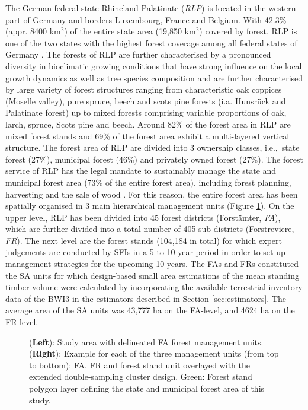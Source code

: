 \documentclass[remotesensing,article,accept,moreauthors,pdftex,10pt,a4paper]{Definitions/mdpi}
\begin{document}
The German federal state Rhineland-Palatinate (\textit{RLP}) is located in the western part of Germany and borders Luxembourg, France and Belgium. With 42.3\% (appr. 8400 km$^2$) of the entire state area (19,850 km$^2$) covered by forest, RLP is one of the two states with the highest forest coverage among all federal states of Germany \citep{bwi3}. The forests of RLP are further characterised by a pronounced diversity in bioclimatic growing conditions that have strong influence on the local growth dynamics as well as tree species composition \citep{gauer2005} and are further characterised by large variety of forest structures ranging from characteristic oak coppices (Moselle valley), pure spruce, beech and scots pine forests (i.a. Hunsr{\"u}ck and Palatinate forest) up to mixed forests comprising variable proportions of oak, larch, spruce, Scots pine and beech. Around 82\% of the forest area in RLP are mixed forest stands and 69\% of the forest area exhibit a multi-layered vertical structure. The forest area of RLP are divided into 3 ownership classes, i.e.,~state forest (27\%), municipal forest (46\%) and privately owned forest (27\%). The forest service of RLP has the legal mandate to sustainably manage the state and municipal forest area (73\% of the entire forest area), including forest planning, harvesting and the sale of wood \citep{lwaldg_rlp}. For this reason, the entire forest area has been spatially organised in 3 main hierarchical management units (Figure \ref{fig:StudyArean}). On the upper level, RLP has been divided into 45 forest districts (Forst{\"a}mter, \textit{FA}), which are further divided into a total number of 405 sub-districts (Forstreviere, \textit{FR}). The next level are the forest stands (104,184 in total) for which expert judgements are conducted by SFIs in a 5 to 10 year period in order to set up management strategies for the upcoming 10 years. The FAs and FRs constituted the SA units for which design-based small area estimations of the mean standing timber volume were calculated by incorporating the available terrestrial inventory data of the BWI3 in the estimators described in Section \ref{sec:estimators}. The average area of the SA units was 43,777 ha on the FA-level, and 4624 ha on the FR level.

\begin{figure}[H]
	\centering
	\caption{({\textbf{Left}}): Study area with delineated FA forest management units. {(\textbf{Right}}): Example for each of the three management units (from top to bottom): FA, FR and forest stand unit overlayed with the extended double-sampling cluster design. {Green}: Forest stand polygon layer defining the state and municipal forest area of this study.}
	\label{fig:StudyArean}
\end{figure}
\end{document}
